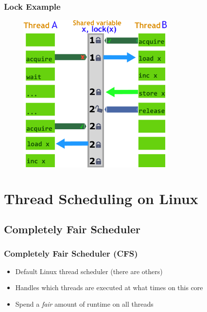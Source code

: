 \documentclass{beamer}
\begin{document}
\begin{frame}
\frametitle{Lock Example}
	\begin{figure}
		\includegraphics[width=0.7\textwidth]{Illustrations/Lock}
		\label{fig:lock}
	\end{figure}
\end{frame}

\section[Thread Scheduling]{Thread Scheduling on Linux}
\subsection[CFS]{Completely Fair Scheduler}
\begin{frame}
\frametitle{Completely Fair Scheduler (CFS)}

\begin{itemize}
\item Default Linux thread scheduler (there are others)
\item Handles which threads are executed at what times on this core
\item Spend a \emph{fair} amount of runtime on all threads
\end{itemize}

\end{frame}
\end{document}

